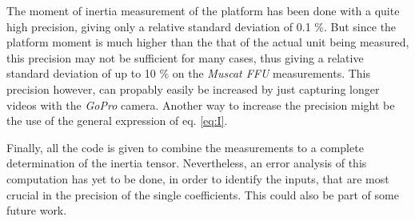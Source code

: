 \documentclass[journal]{IEEEtran}
\begin{document}
The moment of inertia measurement of the platform has been done with a quite high precision, giving only a relative standard deviation of 0.1 \%.
But since the platform moment is much higher than the that of the actual unit being measured, this precision may not be sufficient for many cases, thus giving a relative standard deviation of up to 10 \% on the \emph{Muscat FFU} measurements.
This precision however, can propably easily be increased by just capturing longer videos with the \emph{GoPro} camera.
Another way to increase the precision might be the use of the general expression of eq. \ref{eq:I}.

Finally, all the code is given to combine the measurements to a complete determination of the inertia tensor. Nevertheless, an error analysis of this computation has yet to be done, in order to identify the inputs, that are most crucial in the precision of the single coefficients. This could also be part of some future work.


%



\ifCLASSOPTIONcaptionsoff
  \newpage
\fi
\end{document}

